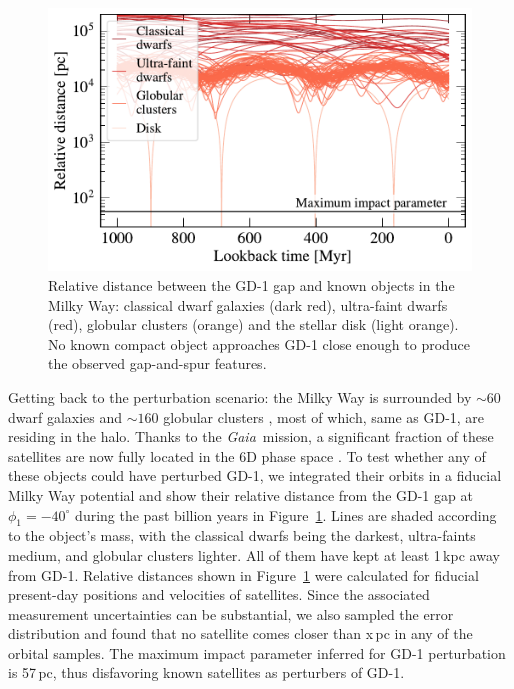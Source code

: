 \documentclass[twocolumn]{aastex62}
\newcommand{\gaia}{\textsl{Gaia}}
\begin{document}
\begin{figure}
\begin{center}
\includegraphics[width=\columnwidth]{satellite_distances.pdf}
\end{center}
\caption{Relative distance between the GD-1 gap and known objects in the Milky Way: classical dwarf galaxies (dark red), ultra-faint dwarfs (red), globular clusters (orange) and the stellar disk (light orange).
No known compact object approaches GD-1 close enough to produce the observed gap-and-spur features.
}
\label{fig:known_encounters}
\end{figure}

Getting back to the perturbation scenario: the Milky Way is surrounded by $\sim60$ dwarf galaxies \citep{mcconnachie2012} and $\sim160$ globular clusters \citep{harris2010}, most of which, same as GD-1, are residing in the halo.
Thanks to the \gaia\ mission, a significant fraction of these satellites are now fully located in the 6D phase space \citep{simon2018, gdr2_satellites}.
To test whether any of these objects could have perturbed GD-1, we integrated their orbits in a fiducial Milky Way potential \citep{pw2017} and show their relative distance from the GD-1 gap at $\phi_1=-40^\circ$ during the past billion years in Figure~\ref{fig:known_encounters}.
Lines are shaded according to the object's mass, with the classical dwarfs being the darkest, ultra-faints medium, and globular clusters lighter.
All of them have kept at least 1\,kpc away from GD-1.
Relative distances shown in Figure~\ref{fig:known_encounters} were calculated for fiducial present-day positions and velocities of satellites.
Since the associated measurement uncertainties can be substantial, we also sampled the error distribution and found that no satellite comes closer than x\,pc in any of the orbital samples.
The maximum impact parameter inferred for GD-1 perturbation is 57\,pc, thus disfavoring known satellites as perturbers of GD-1.
\end{document}
